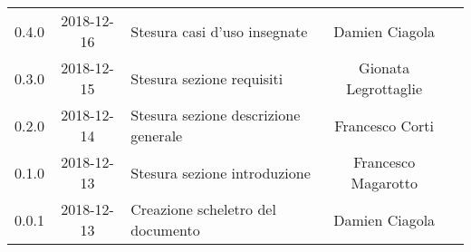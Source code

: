{\begin{longtable}{ c c C{6cm} c c }
		0.4.0 & 
		2018-12-16 &  
		Stesura casi d'uso insegnate &	
		Damien Ciagola &	
		\reda{} \\
		
		0.3.0 & 
		2018-12-15 &  
		Stesura sezione requisiti &	
		Gionata Legrottaglie &	
		\reda{} \\
		
		0.2.0 & 
		2018-12-14 &  
		Stesura sezione descrizione generale	&	
		Francesco Corti &
		\reda{} \\
		
		0.1.0 & 
		2018-12-13 &  
		Stesura sezione introduzione &	
		Francesco Magarotto &	
		\reda{}  \\
		
		0.0.1 & 
		2018-12-13 &  
		Creazione scheletro del documento&	
		Damien Ciagola  &	
		\reda{}  \\
	\end{longtable}

}